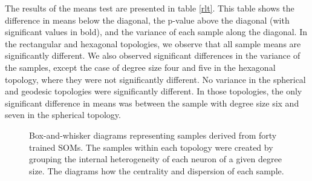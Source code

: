 The results of the means test are presented in table \ref{rlt}. This table
shows the difference in means below the diagonal, the p-value above the
diagonal (with significant values in bold), and the variance of each
sample along the diagonal.  In the rectangular and hexagonal topologies, we
observe that all sample means are significantly different.  We also observed
significant differences in the variance of the samples, except the case of
degree size four and five in the hexagonal topology, where they were not
significantly different. No variance in the spherical and geodesic topologies
were significantly different.  In those topologies, the only significant
difference in means was between the sample with degree size six and seven in
the spherical topology.

\begin{figure}
\centering
{}
\caption{Box-and-whisker diagrams representing samples derived from forty
trained SOMs.  The samples within each topology were created by grouping the
internal heterogeneity of each neuron of a given degree size. The diagrams how the
centrality and dispersion of each sample.}
\label{boxplot}
\end{figure}


